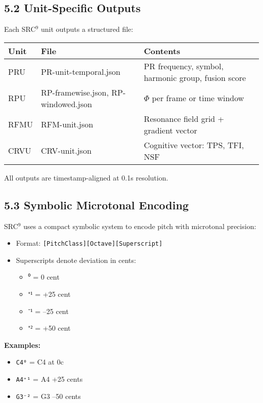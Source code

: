 \documentclass[10pt]{article}
\begin{document}
\subsection*{5.2 Unit-Specific Outputs}

Each SRC$^{9}$ unit outputs a structured file:

\begin{center}
\begin{tabular}{|l|l|l|}
\hline
\textbf{Unit} & \textbf{File} & \textbf{Contents} \\
\hline
PRU & PR-unit-temporal.json & PR frequency, symbol, harmonic group, fusion score \\
RPU & RP-framewise.json, RP-windowed.json & $\Phi$ per frame or time window \\
RFMU & RFM-unit.json & Resonance field grid + gradient vector \\
CRVU & CRV-unit.json & Cognitive vector: TPS, TFI, NSF \\
\hline
\end{tabular}
\end{center}

All outputs are timestamp-aligned at 0.1s resolution.

\subsection*{5.3 Symbolic Microtonal Encoding}

SRC$^{9}$ uses a compact symbolic system to encode pitch with microtonal precision:

\begin{itemize}
    \item Format: \texttt{[PitchClass][Octave][Superscript]}
    \item Superscripts denote deviation in cents:
    \begin{itemize}
        \item $⁰$ = 0 cent
        \item $⁺¹$ = +25 cent
        \item $⁻¹$ = –25 cent
        \item $⁺²$ = +50 cent
    \end{itemize}
\end{itemize}

\textbf{Examples:}

\begin{itemize}
    \item \texttt{C4⁰} = C4 at 0c
    \item \texttt{A4⁺¹} = A4 +25 cents
    \item \texttt{G3⁻²} = G3 –50 cents
\end{itemize}
\end{document}
